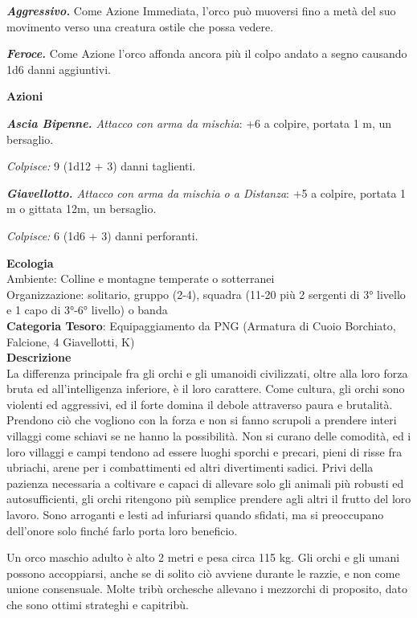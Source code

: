 \begin{multicols}{2}
{\emph{\textbf{Aggressivo.}} Come Azione Immediata, l'orco può muoversi fino a metà del suo movimento verso una creatura ostile che possa vedere.

\emph{\textbf{Feroce.}} Come Azione l'orco affonda ancora più il colpo andato a segno causando 1d6 danni aggiuntivi.

\textbf{Azioni}

\emph{\textbf{Ascia Bipenne.} Attacco con arma da mischia}: +6 a colpire, portata 1 m, un bersaglio.

\emph{Colpisce:} 9 (1d12 + 3) danni taglienti.

\emph{\textbf{Giavellotto.} Attacco con arma da mischia o a Distanza}: +5 a colpire, portata 1 m o gittata 12m, un bersaglio.

\emph{Colpisce:} 6 (1d6 + 3) danni perforanti.

\textbf{Ecologia}\\
Ambiente: Colline e montagne temperate o sotterranei\\
Organizzazione: solitario, gruppo (2-4), squadra (11-20 più 2 sergenti di 3° livello e 1 capo di 3°-6° livello) o banda \\
\textbf{Categoria Tesoro}: Equipaggiamento da PNG (Armatura di Cuoio Borchiato, Falcione, 4 Giavellotti, K)\\
\textbf{Descrizione}\\
La differenza principale fra gli orchi e gli umanoidi civilizzati, oltre alla loro forza bruta ed all'intelligenza inferiore, è il loro carattere. Come cultura, gli orchi sono violenti ed aggressivi, ed il forte domina il debole attraverso paura e brutalità. Prendono ciò che vogliono con la forza e non si fanno scrupoli a prendere interi villaggi come schiavi se ne hanno la possibilità. Non si curano delle comodità, ed i loro villaggi e campi tendono ad essere luoghi sporchi e precari, pieni di risse fra ubriachi, arene per i combattimenti ed altri divertimenti sadici. Privi della pazienza necessaria a coltivare e capaci di allevare solo gli animali più robusti ed autosufficienti, gli orchi ritengono più semplice prendere agli altri il frutto del loro lavoro. Sono arroganti e lesti ad infuriarsi quando sfidati, ma si preoccupano dell'onore solo finché farlo porta loro beneficio.

Un orco maschio adulto è alto 2 metri e pesa circa 115 kg. Gli orchi e gli umani possono accoppiarsi, anche se di solito ciò avviene durante le razzie, e non come unione consensuale. Molte tribù orchesche allevano i mezzorchi di proposito, dato che sono ottimi strateghi e capitribù.

}
\end{multicols}
